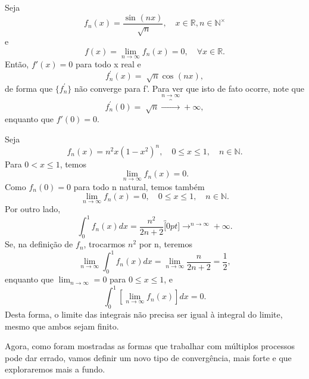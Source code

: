 \documentclass[../analysis_notes.tex]{subfiles}
\begin{document}
\begin{example}
	Seja
	\[
		f_{n}(x)=\frac{\sin^{}{(nx)}}{\sqrt[]{n}},\quad x\in \mathbb{R}, n\in \mathbb{N}^{\times}
	\]
	e
	\[
		f(x)=\lim_{n\to \infty}f_{n}(x)=0,\quad \forall x\in \mathbb{R}.
	\]
	Então, \(f'(x)=0\) para todo x real e
	\[
		f_{n}^{'}(x)=\sqrt[]{n}\cos^{}{(nx)},
	\]
	de forma que \(\{f_{n}^{'}\}\) não converge para f'. Para ver que isto de fato ocorre, note que
	\[
		f_{n}^{'}(0)=\sqrt[]{n}\overbrace{\longrightarrow}^{n\to\infty}+\infty,
	\]
	enquanto que \(f'(0)=0.\)
\end{example}
\begin{example}
	Seja
	\[
		f_{n}(x)=n^{2}x(1-x^{2})^{n},\quad 0\leq x\leq 1,\quad n\in \mathbb{N}.
	\]
	Para \(0 < x \leq 1\), temos
	\[
		\lim_{n\to \infty}f_{n}(x)=0.
	\]
	Como \(f_{n}(0)=0\) para todo n natural, temos também
	\[
		\lim_{n\to \infty}f_{n}(x)=0,\quad 0\leq x\leq 1,\quad n\in \mathbb{N}.
	\]
	Por outro lado,
	\[
		\int_{0}^{1}f_{n}(x)dx=\frac{n^{2}}{2n+2}\overbracket[0pt]{\longrightarrow}^{n\to \infty}+\infty.
	\]
	Se, na definição de \(f_{n}\), trocarmos \(n^{2}\) por n, teremos
	\[
		\lim_{n\to \infty}\int_{0}^{1}f_{n}(x)dx=\lim_{n\to \infty}\frac{n}{2n+2}=\frac{1}{2},
	\]
	enquanto que \(\lim_{n\to \infty}=0\) para \(0\leq x\leq 1\), e
	\[
		\int_{0}^{1}[\lim_{n\to \infty}f_{n}(x)]dx=0.
	\]
	Desta forma, o limite das integrais não precisa ser igual à integral do limite, mesmo que ambos sejam finito.
\end{example}
Agora, como foram mostradas as formas que trabalhar com múltiplos processos pode dar errado, vamos definir um novo tipo de convergência, mais forte e que exploraremos mais a fundo.
\end{document}
